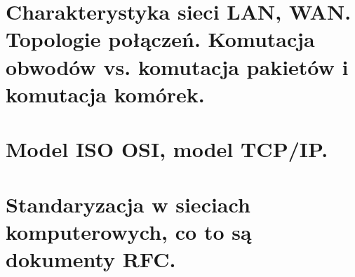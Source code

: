 \documentclass[a4paper]{article}
\begin{document}


    \section{Charakterystyka sieci LAN, WAN. Topologie połączeń. Komutacja obwodów vs. komutacja
    pakietów i komutacja komórek.}
    

    \section{Model ISO OSI, model TCP/IP.}
    

    \section{Standaryzacja w sieciach komputerowych, co to są dokumenty RFC.}
    
\end{document}
